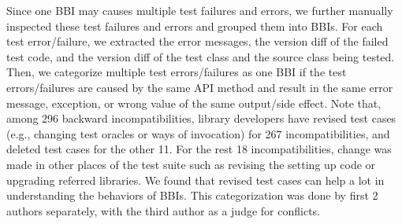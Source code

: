 Since one BBI may causes multiple test failures and errors, we further manually inspected these test failures and errors and grouped them into BBIs. For each test error/failure, we extracted the error messages, the version diff of the failed test code, and the version diff of the test class and the source class being tested. Then, we categorize multiple test errors/failures as one BBI if the test errors/failures are caused by the same API method and result in the same error message, exception, or wrong value of the same output/side effect. Note that, among 296 backward incompatibilities, library developers have revised test cases (e.g., changing test oracles or ways of invocation) for 267 incompatibilities, and deleted test cases for the other 11. For the rest 18 incompatibilities, change was made in other places of the test suite such as revising the setting up code or upgrading referred libraries. We found that revised test cases can help a lot in understanding the behaviors of BBIs. This categorization was done by first 2 authors separately, with the third author as a judge for conflicts. %

 


